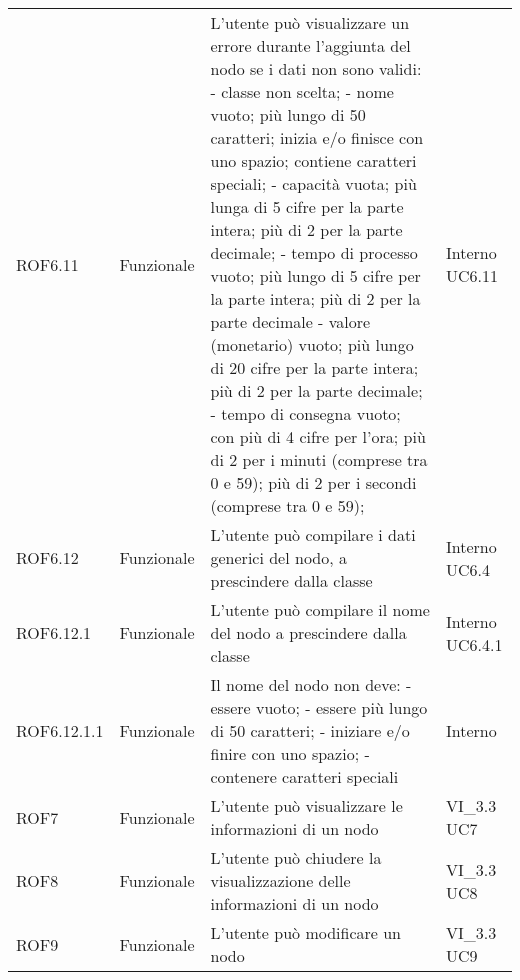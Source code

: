 \begin{longtable}{p{2cm}!{\VRule[1pt]}p{2cm}!{\VRule[1pt]}p{5cm}!{\VRule[1pt]}p{1.5cm}}
	\\
	ROF6.11&Funzionale\newline  & L'utente può visualizzare un errore durante l'aggiunta del nodo se i dati non sono validi:
	- classe non scelta;
	- nome vuoto; più lungo di 50 caratteri; inizia e/o finisce con uno spazio; contiene caratteri speciali;
	- capacità vuota; più lunga di 5 cifre per la parte intera; più di 2 per la parte decimale;
	- tempo di processo vuoto; più lungo di 5 cifre per la parte intera; più di 2 per la parte decimale
	- valore (monetario) vuoto; più lungo di 20 cifre per la parte intera; più di 2 per la parte decimale;
	- tempo di consegna vuoto; con più di 4 cifre per l'ora; più di 2 per i minuti (comprese tra 0 e 59); più di 2 per i secondi (comprese tra 0 e 59); & Interno \newline UC6.11
	\\
	ROF6.12                          & Funzionale\newline               & L'utente può compilare i dati generici del nodo, a prescindere dalla classe                                              & Interno \newline UC6.4       
	\\
	ROF6.12.1                        & Funzionale\newline               & L'utente può compilare il nome del nodo a prescindere dalla classe                                                       & Interno \newline UC6.4.1     
	\\
	ROF6.12.1.1&Funzionale\newline  & Il nome del nodo non deve:
	- essere vuoto;
	- essere più lungo di 50 caratteri;
	- iniziare e/o finire con uno spazio;
	- contenere caratteri speciali & Interno \\
	ROF7                             & Funzionale\newline               & L'utente può visualizzare le informazioni di un nodo                                                                     & VI_3.3 \newline UC7          
	\\
	ROF8                             & Funzionale\newline               & L'utente può chiudere la visualizzazione delle informazioni di un nodo                                                   & VI_3.3 \newline UC8          
	\\
	ROF9                             & Funzionale\newline               & L'utente può modificare un nodo                                                                                          & VI_3.3 \newline UC9          

\end{longtable}
